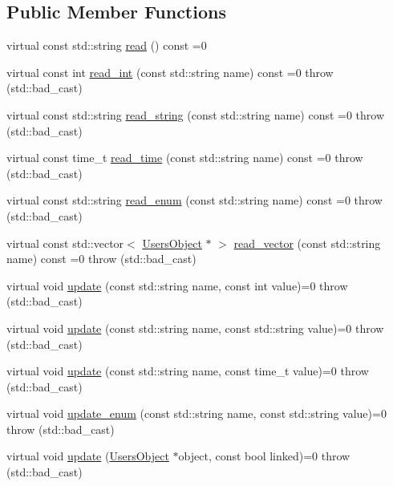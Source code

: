\subsection*{Public Member Functions}
\begin{DoxyCompactItemize}
\item 
virtual const std::string \hyperlink{classUI_1_1UsersObject_a68d5297258a2f4da4ff58f4809690db3}{read} () const =0
\item 
virtual const int \hyperlink{classUI_1_1UsersObject_a63ab79bb54b6134a483b2e384c824c7e}{read\_\-int} (const std::string name) const =0  throw (std::bad\_\-cast)
\item 
virtual const std::string \hyperlink{classUI_1_1UsersObject_aed80fcf20b550a0e3484fbe6beb24c19}{read\_\-string} (const std::string name) const =0  throw (std::bad\_\-cast)
\item 
virtual const time\_\-t \hyperlink{classUI_1_1UsersObject_a490536c477c5a796724ce26fd010c680}{read\_\-time} (const std::string name) const =0  throw (std::bad\_\-cast)
\item 
virtual const std::string \hyperlink{classUI_1_1UsersObject_a20ea26010f60e60f38d380fdaa9240d5}{read\_\-enum} (const std::string name) const =0  throw (std::bad\_\-cast)
\item 
virtual const std::vector$<$ \hyperlink{classUI_1_1UsersObject}{UsersObject} $\ast$ $>$ \hyperlink{classUI_1_1UsersObject_a6899d8a06268abb8f2a13feba9921ce5}{read\_\-vector} (const std::string name) const =0  throw (std::bad\_\-cast)
\item 
virtual void \hyperlink{classUI_1_1UsersObject_a9b30123c0a25a66715bce9a58a27d37e}{update} (const std::string name, const int value)=0  throw (std::bad\_\-cast)
\item 
virtual void \hyperlink{classUI_1_1UsersObject_a4c86312e8400ce3e1b5d2c17552ce5f5}{update} (const std::string name, const std::string value)=0  throw (std::bad\_\-cast)
\item 
virtual void \hyperlink{classUI_1_1UsersObject_add0bfcc5674bd3f56eeb68919c640bb7}{update} (const std::string name, const time\_\-t value)=0  throw (std::bad\_\-cast)
\item 
virtual void \hyperlink{classUI_1_1UsersObject_a925f50c5cb5123a13493f76029ae6f06}{update\_\-enum} (const std::string name, const std::string value)=0  throw (std::bad\_\-cast)
\item 
virtual void \hyperlink{classUI_1_1UsersObject_af4cdeca80652e7c57d34aacc7d0a5dc3}{update} (\hyperlink{classUI_1_1UsersObject}{UsersObject} $\ast$object, const bool linked)=0  throw (std::bad\_\-cast)
\end{DoxyCompactItemize}



